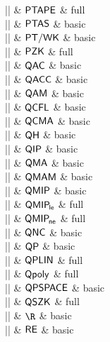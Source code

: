 |\PTAPE|    & ${\mathsf{PTAPE}}$ & full \\

|\PTAS|    & ${\mathsf{PTAS}}$ & basic \\

|\PTWK|    & ${\mathsf{PT/WK}}$ & basic \\

|\PZK|    & ${\mathsf{PZK}}$ & full \\

|\QAC|    & ${\mathsf{QAC}}$ & basic \\

|\QACC|    & ${\mathsf{QACC}}$ & basic \\

|\QAM|    & ${\mathsf{QAM}}$ & basic \\

|\QCFL|    & ${\mathsf{QCFL}}$ & basic \\

|\QCMA|    & ${\mathsf{QCMA}}$ & basic \\

|\QH|    & ${\mathsf{QH}}$ & basic \\

|\QIP|    & ${\mathsf{QIP}}$ & basic \\

|\QMA|    & ${\mathsf{QMA}}$ & basic \\

|\QMAM|    & ${\mathsf{QMAM}}$ & basic \\

|\QMIP|    & ${\mathsf{QMIP}}$ & basic \\

|\QMIPle|    & ${{\mathsf{QMIP}}_{{\kern-.10em}{\mathsf{le}}}}$ & full \\

|\QMIPne|    & ${{\mathsf{QMIP}}_{{\kern-.10em}{\mathsf{ne}}}}$ & full \\

|\QNC|    & ${\mathsf{QNC}}$ & basic \\

|\QP|    & ${\mathsf{QP}}$ & basic \\

|\QPLIN|    & ${\mathsf{QPLIN}}$ & full \\

|\Qpoly|    & ${\mathsf{Qpoly}}$ & full \\

|\QPSPACE|    & ${\mathsf{QPSPACE}}$ & basic \\

|\QSZK|    & ${\mathsf{QSZK}}$ & full \\

|\R|    & $\R$ & basic \\

|\RE|    & ${\mathsf{RE}}$ & basic \\

